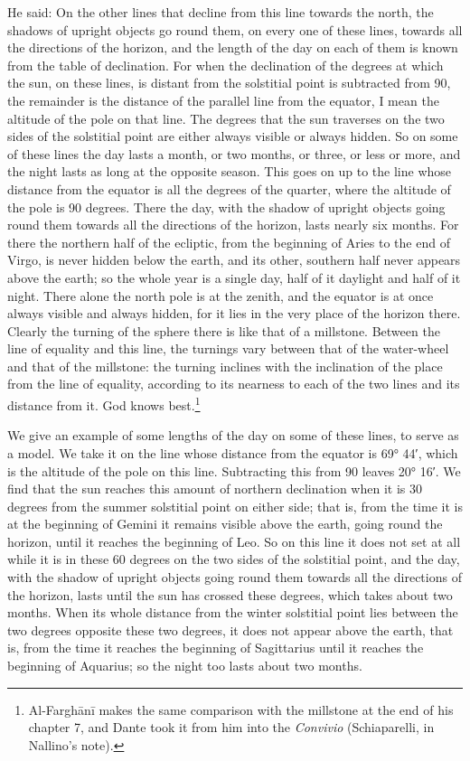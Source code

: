 \documentclass[11pt]{article}
\newcommand{\ArPage}[1]{\marginpar{\footnotesize\color{gray}Ar.\,p.\,#1}}
\begin{document}
\par \ArPage{24}He said: On the other lines that decline from this line towards the north, the shadows of upright objects go round them, on every one of these lines, towards all the directions of the horizon, and the length of the day on each of them is known from the table of declination. For when the declination of the degrees at which the sun, on these lines, is distant from the solstitial point is subtracted from 90, the remainder is the distance of the parallel line from the equator, I mean the altitude of the pole on that line. The degrees that the sun traverses on the two sides of the solstitial point are either always visible or always hidden. So on some of these lines the day lasts a month, or two months, or three, or less or more, and the night lasts as long at the opposite season. This goes on up to the line whose distance from the equator is all the degrees of the quarter, where the altitude of the pole is 90 degrees. There the day, with the shadow of upright objects going round them towards all the directions of the horizon, lasts nearly six months. For there the northern half of the ecliptic, from the beginning of Aries to the end of Virgo, is never hidden below the earth, and its other, southern half never appears above the earth; so the whole year is a single day, half of it daylight and half of it night. There alone the north pole is at the zenith, and the equator is at once always visible and always hidden, for it lies in the very place of the horizon there. Clearly the turning of the sphere there is like that of a millstone. Between the line of equality and this line, the turnings vary between that of the water-wheel and that of the millstone: the turning inclines with the inclination of the place from the line of equality, according to its nearness to each of the two lines and its distance from it. God knows best.\footnote{Al-Farghānī makes the same comparison with the millstone at the end of his chapter 7, and Dante took it from him into the \emph{Convivio} (Schiaparelli, in Nallino's note).}\par
\par We give an example of some lengths of the day on some of these lines, to serve as a model. We take it on the line whose distance from the equator is 69° 44′, which is the altitude of the pole on this line. Subtracting this from 90 leaves 20° 16′. We find that the sun reaches this amount of northern declination when it is 30 degrees from the summer solstitial point on either side; that is, from the time it is at the beginning of Gemini it remains visible above the earth, going round the horizon, until it reaches the beginning of Leo. So on this line it does not set at all while it is in these 60 degrees on the two sides of the solstitial point, and the day, with the shadow of upright objects going round them towards all the directions of the horizon, lasts until the sun has crossed these degrees, which takes about two months. When its whole distance from the winter solstitial point lies between the two degrees opposite these two degrees, it does not appear above the earth, that is, from the time it reaches the beginning of Sagittarius until it reaches the beginning of Aquarius; so the night too lasts about two months.\par
\end{document}
